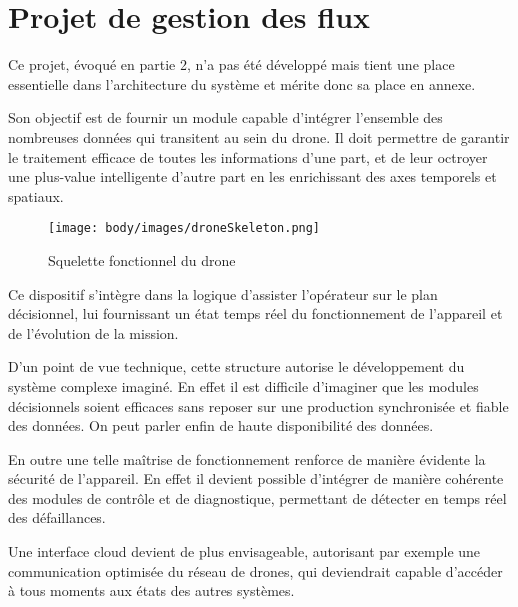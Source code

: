 \section{Projet de gestion des flux}

Ce projet, évoqué en partie 2, n'a pas été développé mais tient une place
essentielle dans l'architecture du système et mérite donc sa place en
annexe.\newline

Son objectif est de fournir un module capable d'intégrer l'ensemble des
nombreuses données qui transitent au sein du drone. Il doit permettre de
garantir le traitement efficace de toutes les informations d'une part, et
de leur octroyer une plus-value intelligente d'autre part en les
enrichissant des axes temporels et spatiaux.\newline

\begin{figure}[H]
    \begin{center}
        \texttt{[image: body/images/droneSkeleton.png]}
    \end{center}
    \caption{Squelette fonctionnel du drone}
    \label{fig:squelette}
\end{figure}

Ce dispositif s'intègre dans la logique d'assister l'opérateur sur le plan
décisionnel, lui fournissant un état temps réel du fonctionnement de
l'appareil et de l'évolution de la mission. \newline

D'un point de vue technique, cette structure autorise le développement du
système complexe imaginé. En effet il est difficile d'imaginer que les
modules décisionnels soient efficaces sans reposer sur une production
synchronisée et fiable des données. On peut parler enfin de haute
disponibilité des données.\newline

En outre une telle maîtrise de fonctionnement renforce de manière évidente
la sécurité de l'appareil. En effet il devient possible d'intégrer de
manière cohérente des modules de contrôle et de diagnostique, permettant de
détecter en temps réel des défaillances. \newline

Une interface cloud devient de plus envisageable, autorisant par exemple
une communication optimisée du réseau de drones, qui deviendrait capable
d'accéder à tous moments aux états des autres systèmes.\newline

